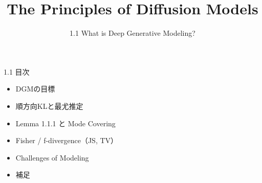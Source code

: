 ﻿%

\title{The Principles of Diffusion Models}
\subtitle{1.1 What is Deep Generative Modeling?}



\begin{frame}
    \titlepage
\end{frame}

\begin{frame}{1.1 目次}
    \begin{itemize}
        \item DGMの目標
        \item 順方向KLと最尤推定
        \item Lemma 1.1.1 と Mode Covering
        \item Fisher / f-divergence（JS, TV）
        \item Challenges of Modeling
        \item 補足
    \end{itemize}
\end{frame}









